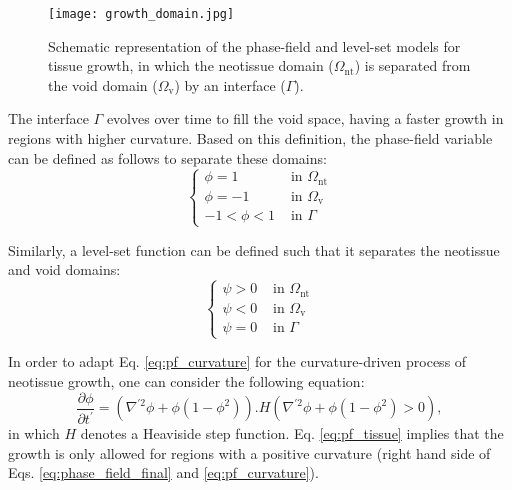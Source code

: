 \begin{figure}
\centering
\medskip
\texttt{[image: growth\_domain.jpg]}
\caption[Schematic representation of the phase-field and level-set models for tissue growth]{Schematic representation of the phase-field and level-set models for tissue growth, in which the neotissue domain ($\Omega_{\text{nt}}$) is separated from the void domain ($\Omega_{\text{v}}$) by an interface ($\Gamma$).}
\label{fig:growth_domain}
\end{figure}

The interface $\Gamma$ evolves over time to fill the void space, having a faster growth in regions with higher curvature. Based on this definition, the phase-field variable can be defined as follows to separate these domains:
\begin{equation} \label{eq:pf_domains}
\left\{\begin{array}{ll}
\phi = 1 & \text{ in } \Omega_{\text{nt}} \\
\phi = -1 & \text{ in } \Omega_{\text{v}} \\
-1 < \phi < 1 & \text{ in } \Gamma
\end{array}\right.
\end{equation}

Similarly, a level-set function can be defined such that it separates the neotissue and void domains:
\begin{equation} \label{eq:ls_domains}
\left\{\begin{array}{ll}
\psi > 0 & \text{ in } \Omega_{\text{nt}} \\
\psi < 0 & \text{ in } \Omega_{\text{v}} \\
\psi = 0 & \text{ in } \Gamma
\end{array}\right.
\end{equation}

In order to adapt Eq. \ref{eq:pf_curvature} for the curvature-driven process of neotissue growth, one can consider the following equation:
\begin{equation} \label{eq:pf_tissue}
\frac{\partial \phi}{\partial t^{\prime}}=\left(\nabla^{\prime 2} \phi+\phi\left(1-\phi^{2}\right)\right).H\left(\nabla^{\prime 2} \phi+\phi\left(1-\phi^{2}\right)>0\right),
\end{equation}
in which $H$ denotes a Heaviside step function. Eq. \ref{eq:pf_tissue} implies that the growth is only allowed for regions with a positive curvature (right hand side of Eqs. \ref{eq:phase_field_final} and \ref{eq:pf_curvature}).

